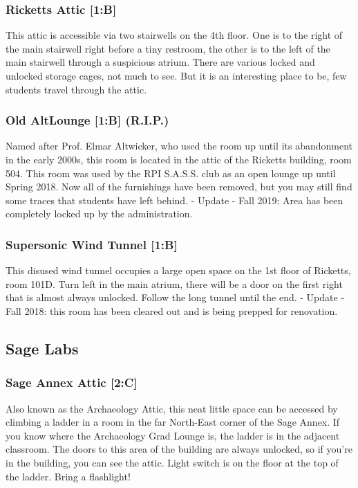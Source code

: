 \documentclass{article}
\begin{document}
\subsubsection{Ricketts Attic [1:B]}
This attic is accessible via two stairwells on the 4th floor. One is to the right of the main stairwell right before a tiny restroom, the other is to the left of the main stairwell through a suspicious atrium. There are various locked and unlocked storage cages, not much to see. But it is an interesting place to be, few students travel through the attic.
\subsubsection{Old AltLounge [1:B] (R.I.P.)}
Named after Prof. Elmar Altwicker, who used the room up until its abandonment in the early 2000s, this room is located in the attic of the Ricketts building, room 504. This room was used by the RPI S.A.S.S. club as an open lounge up until Spring 2018. Now all of the furnishings have been removed, but you may still find some traces that students have left behind.
- Update - Fall 2019: Area has been completely locked up by the administration.

 \subsubsection{Supersonic Wind Tunnel [1:B]}
This disused wind tunnel occupies a large open space on the 1st floor of Ricketts, room 101D. Turn left in the main atrium, there will be a door on the first right that is almost always unlocked. Follow the long tunnel until the end.
- Update - Fall 2018: this room has been cleared out and is being prepped for renovation.
\pagebreak
\subsection{Sage Labs}
\subsubsection{Sage Annex Attic [2:C]}
Also known as the Archaeology Attic, this neat little space can be accessed by climbing a ladder in a room in the far North-East corner of the Sage Annex. If you know where the Archaeology Grad Lounge is, the ladder is in the adjacent classroom. The doors to this area of the building are always unlocked, so if you’re in the building, you can see the attic. Light switch is on the floor at the top of the ladder. Bring a flashlight!
\end{document}
